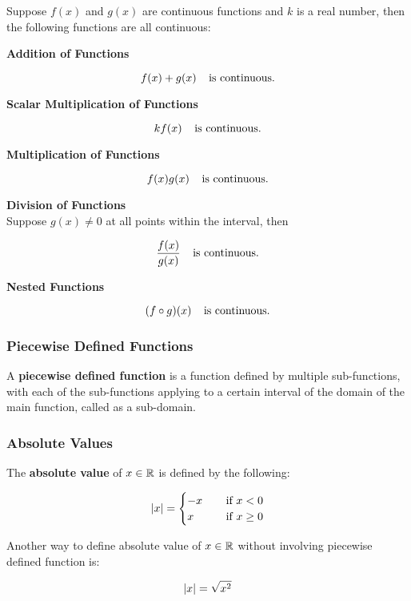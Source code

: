\documentclass[a4paper,12pt]{article}
\begin{document}
\begin{pst}
  Suppose $f(x)$ and $g(x)$ are continuous functions and $k$ is a real number, then the following functions are all continuous:

  \begin{alist}
    \item \textbf{Addition of Functions}

    $$f(x)+g(x)\;\;\;\;\text{is continuous.}$$

    \item \textbf{Scalar Multiplication of Functions}

    $$kf(x)\;\;\;\;\text{is continuous.}$$

    \item \textbf{Multiplication of Functions}

    $$f(x)g(x)\;\;\;\;\text{is continuous.}$$

    \item \textbf{Division of Functions}\\
    Suppose $g(x)\neq 0$ at all points within the interval, then

    $$\frac{f(x)}{g(x)}\;\;\;\;\text{is continuous.}$$

    \item \textbf{Nested Functions}

    $$(f\circ g)(x)\;\;\;\;\text{is continuous.}$$
  \end{alist}
\end{pst}

\subsubsection{Piecewise Defined Functions}
\begin{dft}
  A \textbf{piecewise defined function} is a function defined by multiple sub-functions, with each of the sub-functions applying to a certain interval of the domain of the main function, called as a sub-domain.
\end{dft}

\subsubsection{Absolute Values}
\begin{dft}
  The \textbf{absolute value} of $x\in \mathbb{R}$ is defined by the following:

  $$\left| x\right|=\begin{cases}
    -x&\;\;\;\;\text{if }x<0\\
    x&\;\;\;\;\text{if }x\geq 0
  \end{cases}$$

  Another way to define absolute value of $x\in \mathbb{R}$ without involving piecewise defined function is:

  $$\left| x\right|=\sqrt{x^{2}}$$
\end{dft}
\end{document}

